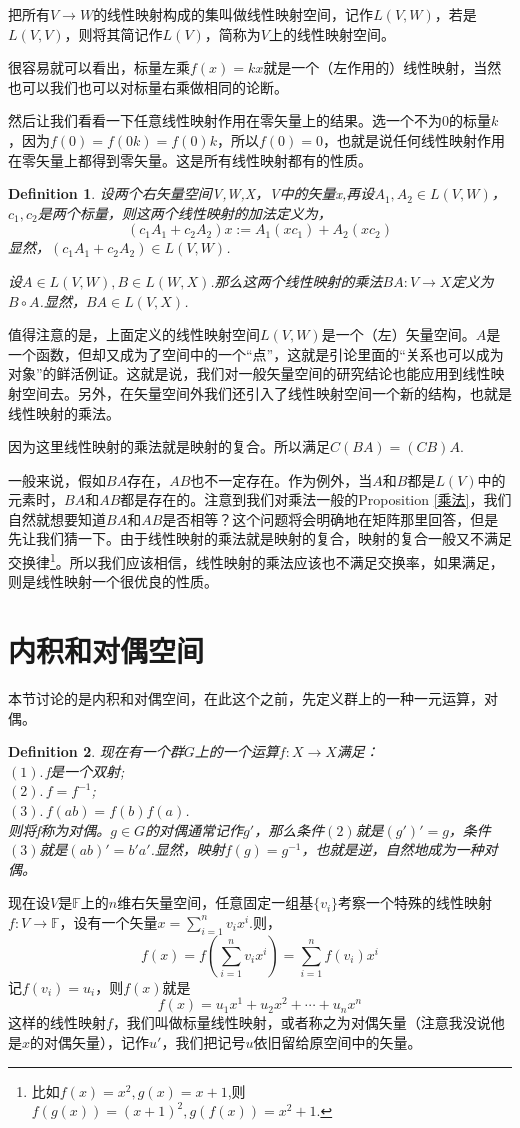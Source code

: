 \documentclass[11pt,a4paper,openany]{book}%
\theoremstyle{plain}%
\newtheorem{defi}{Definition}[chapter]%
\begin{document}
\indent 把所有$V \rightarrow W$的线性映射构成的集叫做线性映射空间，记作$L(V,W)$，若是$L(V,V)$，则将其简记作$L(V)$，简称为$V$上的线性映射空间。

很容易就可以看出，标量左乘$f(x)=kx$就是一个（左作用的）线性映射，当然也可以我们也可以对标量右乘做相同的论断。

然后让我们看看一下任意线性映射作用在零矢量上的结果。选一个不为0的标量$k$，因为$f(0)=f(0k)=f(0)k$，所以$f(0)=0$，也就是说任何线性映射作用在零矢量上都得到零矢量。这是所有线性映射都有的性质。
\begin{defi}
设两个右矢量空间V,W,X，V中的矢量x,再设$A_{1},A_{2}\in L(V,W)$，$c_{1},c_{2}$是两个标量，则这两个线性映射的加法定义为，
\[
(c_1A_{1}+c_2A_{2})x:=A_{1}(xc_1)+A_{2}(xc_2)
\]
显然，$(c_{1}A_{1}+c_{2}A_{2})\in L(V,W)$.

设$A\in L(V,W),B\in L(W,X)$.那么这两个线性映射的乘法$BA:V\rightarrow X$定义为$B \circ A$.显然，$BA\in L(V,X)$.
\end{defi}
\indent 值得注意的是，上面定义的线性映射空间$L(V,W)$是一个（左）矢量空间。$A$是一个函数，但却又成为了空间中的一个“点”，这就是引论里面的“关系也可以成为对象”的鲜活例证。这就是说，我们对一般矢量空间的研究结论也能应用到线性映射空间去。另外，在矢量空间外我们还引入了线性映射空间一个新的结构，也就是线性映射的乘法。

因为这里线性映射的乘法就是映射的复合。所以满足$C(BA)=(CB)A$.

一般来说，假如$BA$存在，$AB$也不一定存在。作为例外，当$A$和$B$都是$L(V)$中的元素时，$BA$和$AB$都是存在的。注意到我们对乘法一般的Proposition \ref{乘法}，我们自然就想要知道$BA$和$AB$是否相等？这个问题将会明确地在矩阵那里回答，但是先让我们猜一下。由于线性映射的乘法就是映射的复合，映射的复合一般又不满足交换律\footnote{比如$f(x)=x^2,g(x)=x+1$,则$f(g(x))=(x+1)^2,g(f(x))=x^2+1$.}。所以我们应该相信，线性映射的乘法应该也不满足交换率，如果满足，则是线性映射一个很优良的性质。
\section{内积和对偶空间}
本节讨论的是内积和对偶空间，在此这个之前，先定义群上的一种一元运算，对偶。
\begin{defi}
现在有一个群$G$上的一个运算$f:X\rightarrow X$满足：\\
$(1).$\,f是一个双射;\\
$(2).$\,$f=f^{-1}$;\\
$(3).$\,$f(ab)=f(b)f(a)$.\\
则将f称为对偶。$g \in G$的对偶通常记作$g'$，那么条件$(2)$就是$(g')'=g$，条件$(3)$就是$(ab)'=b'a'$.显然，映射$f(g)=g^{-1}$，也就是逆，自然地成为一种对偶。
\end{defi}
现在设$V$是$\mathbb{F}$上的$n$维右矢量空间，任意固定一组基$\{v_i\}$考察一个特殊的线性映射$f:V\rightarrow \mathbb{F}$，设有一个矢量$x=\sum_{i=1}^{n}v_{i}x^{i}$.则，
\[
f(x)=f\left(\sum_{i=1}^{n}v_{i}x^{i}\right)=
\sum_{i=1}^{n}f(v_{i})x^{i}
\]
记$f(v_{i})=u_i$，则$f(x)$就是
\begin{equation}
\label{1222}
f(x)=u_1x^1+u_2x^2+\cdots+u_nx^n
\end{equation}
这样的线性映射$f$，我们叫做标量线性映射，或者称之为{\kaishu 对偶矢量}（注意我没说他是$x$的对偶矢量），记作$u'$，我们把记号$u$依旧留给原空间中的矢量。
\end{document}
